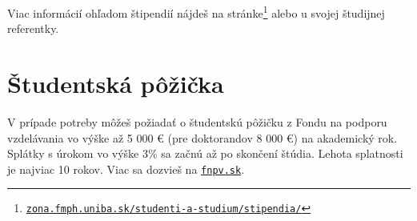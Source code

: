 Viac informácií ohľadom štipendií nájdeš na stránke\footnote{\href{https://zona.fmph.uniba.sk/studenti-a-studium/stipendia/}{\texttt{zona.fmph.uniba.sk/studenti-a-studium/stipendia/}}} alebo u svojej študijnej referentky.

\newpage
\section{Študentská pôžička}

V prípade potreby môžeš požiadať o študentskú pôžičku z Fondu na podporu
vzdelávania vo výške až 5 000 € (pre doktorandov 8 000 €) na akademický
rok. Splátky s úrokom vo výške 3\% sa začnú až po skončení štúdia.
Lehota splatnosti je najviac 10 rokov. Viac sa dozvieš na \href{http://www.fnpv.sk}{\texttt{fnpv.sk}}.
